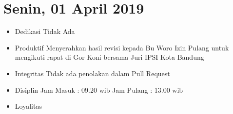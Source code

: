 \section{Senin, 01 April 2019}
\begin{itemize}
\item Dedikasi
\subitem Tidak Ada
\item Produktif
  \subitem Menyerahkan hasil revisi kepada Bu Woro
  \subitem Izin Pulang untuk mengikuti rapat di Gor Koni bersama Juri IPSI Kota Bandung
\item Integritas
  \subitem Tidak ada penolakan dalam Pull Request
\item Disiplin
  \subitem Jam Masuk : 09.20 wib
  \subitem Jam Pulang : 13.00 wib
\item Loyalitas
  \subitem 
\end{itemize}